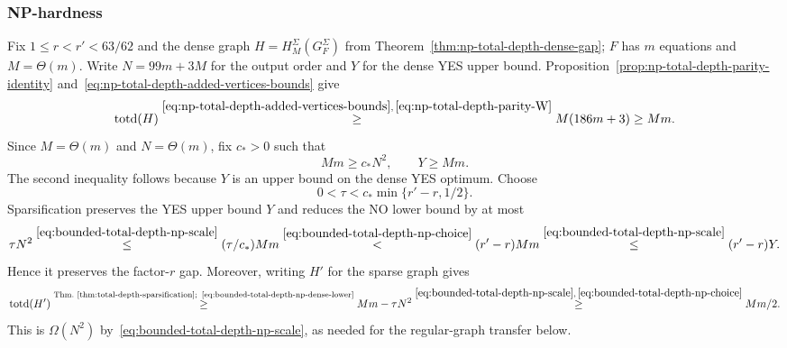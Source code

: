 \subsubsection{NP-hardness}
\label{app:transfer-total-np}
Fix $1\le r<r'<63/62$ and the dense graph
$H=H^\Sigma_M(G_F^\Sigma)$ from
Theorem~\ref{thm:np-total-depth-dense-gap}; $F$ has $m$ equations
and $M=\Theta(m)$.
Write $N=99m+3M$ for the output order and $Y$ for the dense YES
upper bound. Proposition~\ref{prop:np-total-depth-parity-identity}
and~\eqref{eq:np-total-depth-added-vertices-bounds} give
\begin{equation}\label{eq:bounded-total-depth-np-dense-lower}
 \operatorname{totd}(H)
 \overset{\eqref{eq:np-total-depth-added-vertices-bounds},\,
             \eqref{eq:np-total-depth-parity-W}}{\ge}
 M(186m+3)\ge Mm.
\end{equation}
Since $M=\Theta(m)$ and $N=\Theta(m)$, fix $c_*>0$ such that
\begin{equation}\label{eq:bounded-total-depth-np-scale}
 Mm\ge c_*N^2,\qquad Y\ge Mm.
\end{equation}
The second inequality follows because $Y$ is an upper bound on
the dense YES optimum. Choose
\begin{equation}\label{eq:bounded-total-depth-np-choice}
 0<\tau<c_*\min\{r'-r,1/2\}.
\end{equation}
Sparsification preserves the YES
upper bound $Y$ and reduces the NO lower bound by at most
\[
\tau N^2
 \overset{\eqref{eq:bounded-total-depth-np-scale}}{\le}
 (\tau/c_*)Mm
 \overset{\eqref{eq:bounded-total-depth-np-choice}}{<}
 (r'-r)Mm
 \overset{\eqref{eq:bounded-total-depth-np-scale}}{\le}(r'-r)Y.
\]
Hence it preserves the factor-$r$ gap.
Moreover, writing $H'$ for the sparse graph gives
\begin{equation}\label{eq:bounded-total-depth-np-sparse}
\operatorname{totd}(H')
 \overset{\text{Thm.~\ref{thm:total-depth-sparsification};\,
                   \eqref{eq:bounded-total-depth-np-dense-lower}}}{\ge}
 Mm-\tau N^2
  \overset{\eqref{eq:bounded-total-depth-np-scale},\,
              \eqref{eq:bounded-total-depth-np-choice}}{\ge}Mm/2.
\end{equation}
This is $\Omega(N^2)$ by~\eqref{eq:bounded-total-depth-np-scale},
as needed for the regular-graph transfer below.

